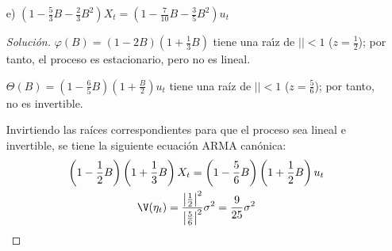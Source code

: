 \begin{ejemplo}
\begin{enumerate}
\item[e)] $\left(1-\frac{5}{3}B-\frac{2}{3}B^{2}\right)X_{t} =\left(1-\frac{7}{10}B-\frac{3}{5}B^{2}\right)u_{t} $ 
\begin{proof}[Soluci\'{o}n]
$\varphi (B)=(1-2B)(1+\frac{1}{3}B)$ tiene una ra\'{\i}z de $\left| \right|< 1$ ($z=\frac{1}{2}$); por tanto, el proceso es estacionario, pero no es lineal.\newline

$\Theta (B)=\left( {1-\frac{6}{5}B} \right)\left( {1+\frac{B}{2}} \right)u_{t} $ tiene una ra\'{i}z de $\left| \right|< 1$ ($z=\frac{5}{6}$); por tanto, no es invertible.\newline

Invirtiendo las ra\'{i}ces correspondientes para que el proceso sea lineal e invertible, se tiene la siguiente ecuaci\'{o}n ARMA can\'{o}nica:
\begin{gather*}
\left(1-\frac{1}{2}B\right)\left(1+\frac{1}{3}B\right)X_{t} =\left(1-\frac{5}{6}B\right)\left(1+\frac{1}{2}B\right)u_{t} 
\\
\V(\eta_{t} )=\frac{\left| {\frac{1}{2}} \right|^{2}}{\left| {\frac{5}{6}} 
\right|^{2}}\sigma^{2}=\frac{9}{25}\sigma^{2}
\end{gather*}
\end{proof}
\end{enumerate}
\end{ejemplo}


